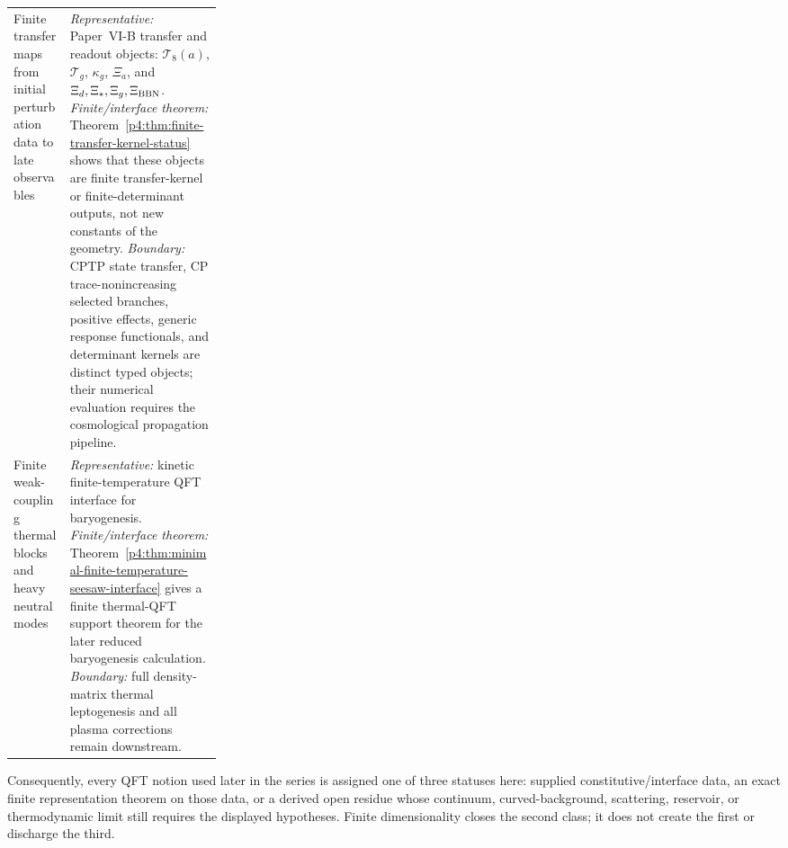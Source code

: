\documentclass[12pt,a4paper]{article}
\begin{document}
\begin{longtable}{@{}
  >{\raggedright\arraybackslash}p{0.27\linewidth}
  >{\raggedright\arraybackslash}p{}
@{}}
Finite transfer maps from initial perturbation data to late observables
&
\textit{Representative:} Paper~VI-B transfer and readout objects:
\(\mathcal T_8(a)\), \(\mathcal T_g\), \(\kappa_g\), \(\Xi_a\), and
\(\Xi_d,\Xi_*,\Xi_g,\Xi_{\rm BBN}\).
\textit{Finite/interface theorem:} Theorem~\ref{p4:thm:finite-transfer-kernel-status} shows that
these objects are finite transfer-kernel or finite-determinant outputs, not new
constants of the geometry.
\textit{Boundary:} CPTP state transfer, CP trace-nonincreasing selected
branches, positive effects, generic response functionals, and determinant
kernels are distinct typed objects; their numerical evaluation requires the
cosmological propagation pipeline. \\

Finite weak-coupling thermal blocks and heavy neutral modes
&
\textit{Representative:} kinetic finite-temperature QFT interface for
baryogenesis.
\textit{Finite/interface theorem:} Theorem~\ref{p4:thm:minimal-finite-temperature-seesaw-interface}
gives a finite thermal-QFT support theorem for the later reduced baryogenesis
calculation.
\textit{Boundary:} full density-matrix thermal leptogenesis and all plasma
corrections remain downstream. \\

\end{longtable}
\endgroup

Consequently, every QFT notion used later in the series is assigned one of
three statuses here: supplied constitutive/interface data, an exact finite
representation theorem on those data, or a derived open residue whose
continuum, curved-background, scattering, reservoir, or thermodynamic limit
still requires the displayed hypotheses.  Finite dimensionality closes the
second class; it does not create the first or discharge the third.
\end{document}
